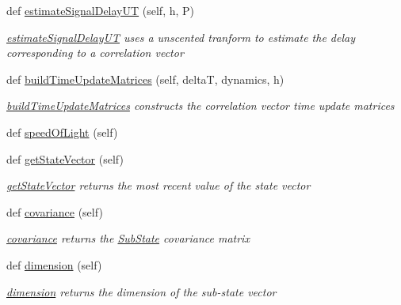 \begin{DoxyCompactItemize}
def \hyperlink{classSignalCorrelationSubstate_1_1CorrelationFilter_aa9e1991566655a89ed084b6918cfb278}{estimate\+Signal\+Delay\+UT} (self, h, P)
\begin{DoxyCompactList}\small\item\em \hyperlink{classSignalCorrelationSubstate_1_1CorrelationFilter_aa9e1991566655a89ed084b6918cfb278}{estimate\+Signal\+Delay\+UT} uses a unscented tranform to estimate the delay corresponding to a correlation vector \end{DoxyCompactList}\item 
def \hyperlink{classSignalCorrelationSubstate_1_1CorrelationFilter_ad05512ccd7d825c60f671f8a66306e28}{build\+Time\+Update\+Matrices} (self, deltaT, dynamics, h)
\begin{DoxyCompactList}\small\item\em \hyperlink{classSignalCorrelationSubstate_1_1CorrelationFilter_ad05512ccd7d825c60f671f8a66306e28}{build\+Time\+Update\+Matrices} constructs the correlation vector time update matrices \end{DoxyCompactList}\item 
def \hyperlink{classSignalCorrelationSubstate_1_1CorrelationFilter_aae801ac673e939678f865f9c0dc23d55}{speed\+Of\+Light} (self)
\item 
def \hyperlink{classSubStates_1_1SubState_a3ebd1a120f63ed477ee76999518a8828}{get\+State\+Vector} (self)
\begin{DoxyCompactList}\small\item\em \hyperlink{classSubStates_1_1SubState_a3ebd1a120f63ed477ee76999518a8828}{get\+State\+Vector} returns the most recent value of the state vector \end{DoxyCompactList}\item 
def \hyperlink{classSubStates_1_1SubState_a4d863939fdb98b2739e1e737ec7496ae}{covariance} (self)
\begin{DoxyCompactList}\small\item\em \hyperlink{classSubStates_1_1SubState_a4d863939fdb98b2739e1e737ec7496ae}{covariance} returns the \hyperlink{classSubStates_1_1SubState}{Sub\+State} covariance matrix \end{DoxyCompactList}\item 
def \hyperlink{classSubStates_1_1SubState_a4aebea19a134cb871a7c0b6c2709546a}{dimension} (self)
\begin{DoxyCompactList}\small\item\em \hyperlink{classSubStates_1_1SubState_a4aebea19a134cb871a7c0b6c2709546a}{dimension} returns the dimension of the sub-\/state vector \end{DoxyCompactList}\end{DoxyCompactItemize}
